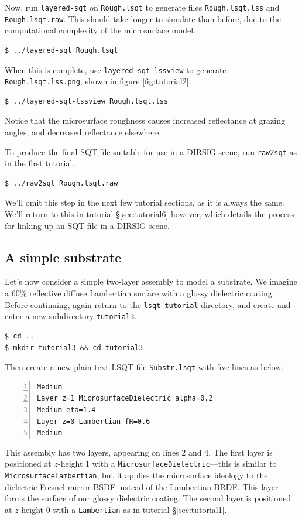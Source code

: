 \documentclass[
    twoside,
    twocolumn,
    letterpaper,
    10pt]{article}
\newcommand\namett[2]{{\color{code#1}\texttt{#2}}}
\begin{document}
Now, run \texttt{layered-sqt} on \texttt{Rough.lsqt} to generate
files \texttt{Rough.lsqt.lss} and \texttt{Rough.lsqt.raw}. This should take
longer to simulate than before, due to the computational complexity of the
microsurface model.
\begin{verbatim}
$ ../layered-sqt Rough.lsqt
\end{verbatim}
When this is complete, use \texttt{layered-sqt-lssview} to generate 
\texttt{Rough.lsqt.lss.png}, shown in figure \ref{fig:tutorial2}.
\begin{verbatim}
$ ../layered-sqt-lssview Rough.lsqt.lss
\end{verbatim}
Notice that the microsurface roughness causes increased reflectance at 
grazing angles, and decreased reflectance elsewhere.

To produce the final SQT file suitable for use in a DIRSIG scene,
run \texttt{raw2sqt} as in the first tutorial.
\begin{verbatim}
$ ../raw2sqt Rough.lsqt.raw
\end{verbatim}
We'll omit this step in the next few tutorial sections, as it is
always the same. We'll return to this in tutorial \S\ref{sec:tutorial6} 
however, which details the process for linking up an SQT file in a 
DIRSIG scene.

\subsection{A simple substrate}
\label{sec:tutorial3}

Let's now consider a simple two-layer assembly to model a substrate. 
We imagine a 60\% reflective diffuse Lambertian surface with a glossy 
dielectric coating. Before continuing, again return to the 
\texttt{lsqt-tutorial} directory, and create and enter a new 
subdirectory \texttt{tutorial3}.
\begin{verbatim}
$ cd ..
$ mkdir tutorial3 && cd tutorial3
\end{verbatim}

Then create a new plain-text LSQT file \texttt{Substr.lsqt} with
five lines as below.
\begin{lstlisting}[numbers=left]
Medium
Layer z=1 MicrosurfaceDielectric alpha=0.2
Medium eta=1.4
Layer z=0 Lambertian fR=0.6
Medium
\end{lstlisting}
This assembly has two layers, appearing on lines 2 and 4. 
The first layer is positioned at $z$-height 1 with a 
\namett{purple}{MicrosurfaceDielectric}---this is similar to 
\namett{purple}{MicrosurfaceLambertian}, 
but it applies 
the microsurface ideology to the dielectric Fresnel mirror BSDF instead of 
the Lambertian BRDF. This layer forms the surface of our glossy dielectric 
coating.
The second layer is positioned at $z$-height 0 with a 
\namett{purple}{Lambertian} as in tutorial \S\ref{sec:tutorial1}.
\end{document}
